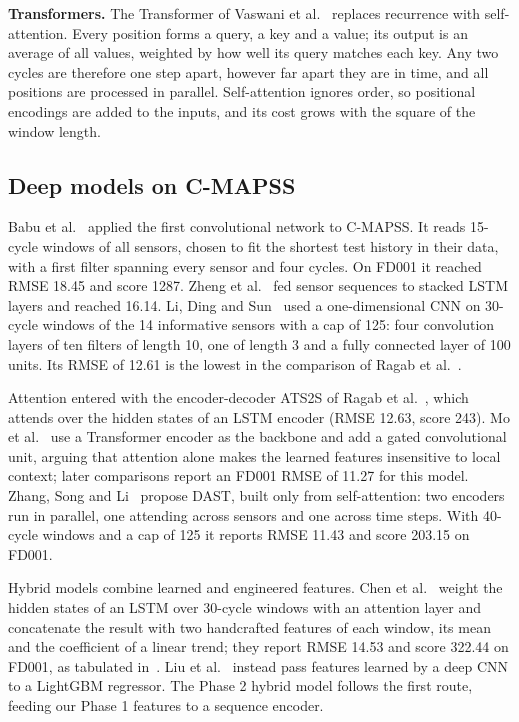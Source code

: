 \textbf{Transformers.} The Transformer of Vaswani et
al.~\cite{vaswani2017attention} replaces recurrence with self-attention.
Every position forms a query, a key and a value; its output is an average of
all values, weighted by how well its query matches each key. Any two cycles
are therefore one step apart, however far apart they are in time, and all
positions are processed in parallel. Self-attention ignores order, so
positional encodings are added to the inputs, and its cost grows with the
square of the window length.

\subsection{Deep models on C-MAPSS}
Babu et al.~\cite{babu2016cnn} applied the first convolutional network to
C-MAPSS. It reads 15-cycle windows of all sensors, chosen to fit the
shortest test history in their data, with a first filter spanning every
sensor and four cycles. On FD001 it reached RMSE 18.45 and score 1287.
Zheng et al.~\cite{zheng2017lstm} fed sensor sequences to stacked LSTM
layers and reached 16.14.
Li, Ding and Sun~\cite{li2018dcnn} used a one-dimensional CNN on 30-cycle
windows of the 14 informative sensors with a cap of 125: four convolution
layers of ten filters of length 10, one of length 3 and a fully connected
layer of 100 units. Its RMSE of 12.61 is the lowest in the comparison of Ragab et
al.~\cite{ragab2020attention}.

Attention entered with the encoder-decoder ATS2S of Ragab et
al.~\cite{ragab2020attention}, which attends over the hidden states of an
LSTM encoder (RMSE 12.63, score 243). Mo et al.~\cite{mo2021gcu} use a
Transformer encoder as the backbone and add a gated convolutional unit,
arguing that attention alone makes the learned features insensitive to local
context; later comparisons report an FD001 RMSE of 11.27 for this model.
Zhang, Song and Li~\cite{zhang2022dast} propose DAST, built only from
self-attention: two encoders run in parallel, one attending across sensors
and one across time steps. With 40-cycle windows and a cap of 125 it reports
RMSE 11.43 and score 203.15 on FD001.

Hybrid models combine learned and engineered features. Chen et
al.~\cite{chen2021attention} weight the hidden states of an LSTM over
30-cycle windows with an attention layer and concatenate the result with two
handcrafted features of each window, its mean and the coefficient of a
linear trend; they report RMSE 14.53 and score 322.44 on FD001, as tabulated
in~\cite{zhang2022dast}. Liu et al.~\cite{liu2021rul} instead pass features
learned by a deep CNN to a LightGBM regressor. The Phase 2 hybrid
model follows the first route, feeding our Phase 1 features to a sequence
encoder.

